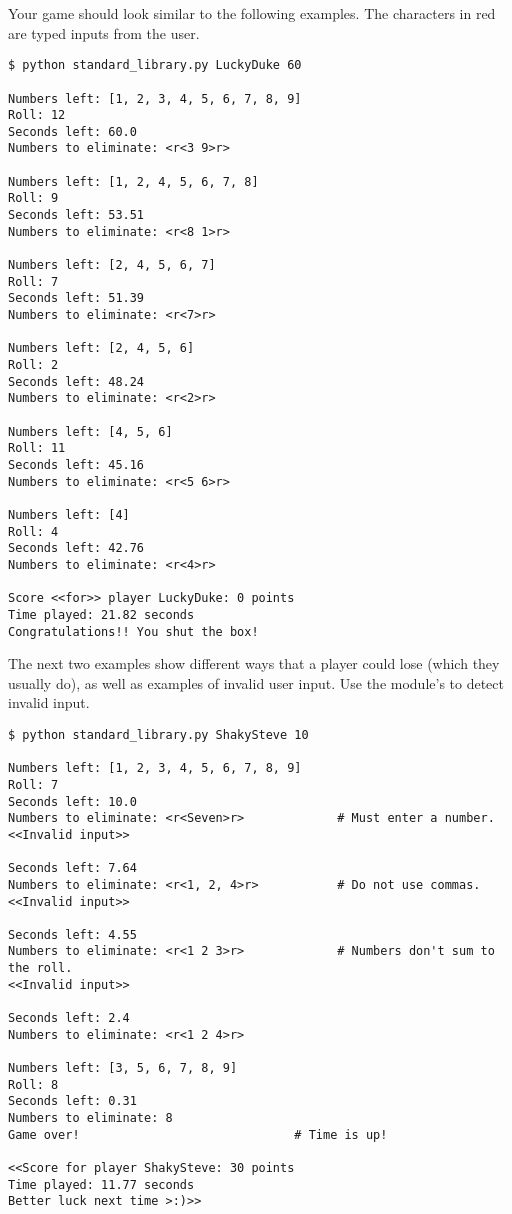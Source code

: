 \begin{problem}
Your game should look similar to the following examples.
The characters in red are typed inputs from the user.

\begin{lstlisting}
$ python standard_library.py LuckyDuke 60

Numbers left: [1, 2, 3, 4, 5, 6, 7, 8, 9]
Roll: 12
Seconds left: 60.0
Numbers to eliminate: <r<3 9>r>

Numbers left: [1, 2, 4, 5, 6, 7, 8]
Roll: 9
Seconds left: 53.51
Numbers to eliminate: <r<8 1>r>

Numbers left: [2, 4, 5, 6, 7]
Roll: 7
Seconds left: 51.39
Numbers to eliminate: <r<7>r>

Numbers left: [2, 4, 5, 6]
Roll: 2
Seconds left: 48.24
Numbers to eliminate: <r<2>r>

Numbers left: [4, 5, 6]
Roll: 11
Seconds left: 45.16
Numbers to eliminate: <r<5 6>r>

Numbers left: [4]
Roll: 4
Seconds left: 42.76
Numbers to eliminate: <r<4>r>

Score <<for>> player LuckyDuke: 0 points
Time played: 21.82 seconds
Congratulations!! You shut the box!
\end{lstlisting}

The next two examples show different ways that a player could lose (which they usually do), as well as examples of invalid user input.
Use the  module's  to detect invalid input.

\begin{lstlisting}
$ python standard_library.py ShakySteve 10

Numbers left: [1, 2, 3, 4, 5, 6, 7, 8, 9]
Roll: 7
Seconds left: 10.0
Numbers to eliminate: <r<Seven>r>             # Must enter a number.
<<Invalid input>>

Seconds left: 7.64
Numbers to eliminate: <r<1, 2, 4>r>           # Do not use commas.
<<Invalid input>>

Seconds left: 4.55
Numbers to eliminate: <r<1 2 3>r>             # Numbers don't sum to the roll.
<<Invalid input>>

Seconds left: 2.4
Numbers to eliminate: <r<1 2 4>r>

Numbers left: [3, 5, 6, 7, 8, 9]
Roll: 8
Seconds left: 0.31
Numbers to eliminate: 8
Game over!                              # Time is up!

<<Score for player ShakySteve: 30 points
Time played: 11.77 seconds
Better luck next time >:)>>
\end{lstlisting}


\end{problem}
